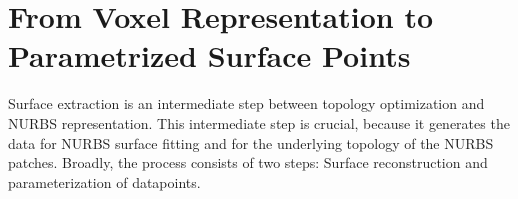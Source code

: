 \section{From Voxel Representation to Parametrized Surface Points}
\label{sec:surfaceImpl}
Surface extraction is an intermediate step between topology optimization and \ac{NURBS} representation. This intermediate step is crucial, because it generates the data for \ac{NURBS} surface fitting and for the underlying topology of the \ac{NURBS} patches. Broadly, the process consists of two steps: Surface reconstruction and parameterization of datapoints.


